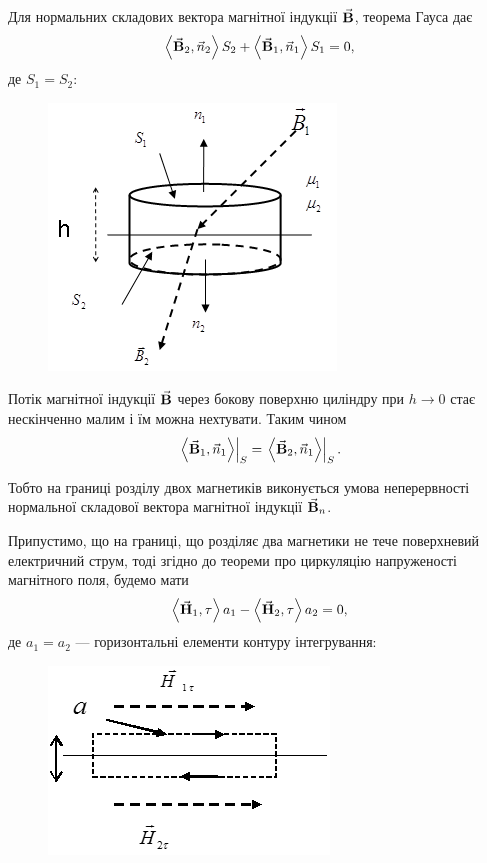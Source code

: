 Для нормальних складових вектора магнітної індукції ${\vec{\mathbf{B}}}$, теорема Гауса дає
\begin{equation}
	\langle \vecf B_2, \vec n_2 \rangle S_2 + \langle \vecf B_1, \vec n_1 \rangle S_1 = 0,
\end{equation}
де $S_1 = S_2$:
\begin{figure}[H]
	\centering
	\includegraphics[width=.5\textwidth]{img/13-5.png}
\end{figure}

Потік магнітної індукції ${\vec{\mathbf{B}}}$ через бокову поверхню циліндру при $h \to 0$ стає нескінченно малим і їм можна нехтувати. Таким чином
\begin{equation}
	\left. \langle \vecf B_1, \vec n_1 \rangle \right|_S = \left. \langle \vecf B_2, \vec n_1 \rangle \right|_S.
\end{equation}

Тобто на границі розділу двох магнетиків виконується умова неперервності нормальної складової вектора магнітної індукції ${\vec{\mathbf{B}}}_n$. \medskip

Припустимо, що на границі, що розділяє два магнетики не тече поверхневий електричний струм, тоді згідно до теореми про циркуляцію напруженості магнітного поля, будемо мати
\begin{equation}
	\langle \vecf H_1, \tau \rangle a_1 - \langle \vecf H_2, \tau \rangle a_2 = 0,
\end{equation}
де $a_1 = a_2$ --- горизонтальні елементи контуру інтегрування:
\begin{figure}[H]
	\centering
	\includegraphics[width=.5\textwidth]{img/13-6.png}
\end{figure}

